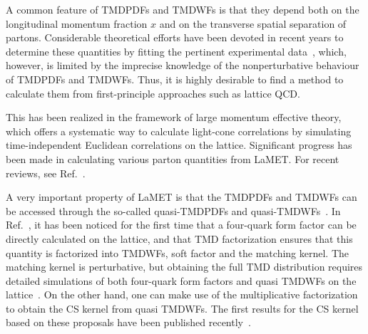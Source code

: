 \documentclass[prd,aps,twocolumn,preprintnumbers, showpacs, nofootinbib,superscriptaddress,notitlepage]{revtex4-1}
\newcommand\bl{\color{blue}}
\begin{document}
A common feature of TMDPDFs and TMDWFs is that they depend both on the longitudinal momentum fraction $x$ and on the transverse spatial separation of partons.  Considerable theoretical efforts have been devoted in recent years to determine these quantities by fitting the pertinent experimental data~\cite{Landry:1999an,Landry:2002ix,DAlesio:2014mrz,Sun:2014dqm,Konychev:2005iy,Bacchetta:2017gcc,Scimemi:2017etj,Scimemi:2019cmh,Bacchetta:2019sam}, which, however, %
is limited by the imprecise knowledge of the nonperturbative behaviour of TMDPDFs and TMDWFs. Thus, it is highly desirable to find a method to calculate them from first-principle approaches such as lattice QCD.


This has been realized in the framework of large momentum effective theory\cite{Ji:2013dva,Ji:2014gla}, which offers a systematic way to calculate light-cone correlations by simulating time-independent Euclidean correlations on the lattice. Significant progress has been made {\bl in} calculating various parton quantities from LaMET. For recent reviews, see Ref.~\cite{Cichy:2018mum,Ji:2020ect}. 

A very important  {\bl property of} LaMET is that the TMDPDFs and TMDWFs can be accessed through the so-called quasi-TMDPDFs and quasi-TMDWFs~\cite{Ebert:2019okf,Ji:2019sxk,Ji:2019ewn,Ji:2021znw}. In Ref.~\cite{Ji:2019sxk}, it has been {\bl noticed for the first time} that  a four-quark form factor can be directly calculated on the lattice,  and {\bl that} TMD factorization ensures that this quantity  is factorized into  TMDWFs,  soft factor and the matching kernel.  The matching kernel is perturbative, but  obtaining the full TMD distribution requires detailed  simulations  of both four-quark form factors and quasi TMDWFs on the lattice~\cite{Ji:2019sxk,Ji:2019ewn}.  On the other hand, one can make use of the multiplicative factorization to obtain {\bl the} CS kernel {\bl from} quasi TMDWFs. The first {\bl results for the CS kernel based on} these proposals {\bl have been published recently~\cite{Shanahan:2020zxr,LatticeParton:2020uhz,Schlemmer:2021aij,Li:2021wvl,Shanahan:2021tst}.} 
\end{document}
